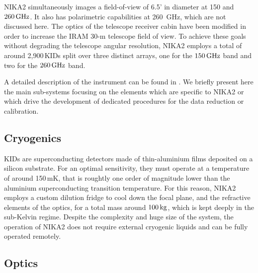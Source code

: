 
NIKA2 simultaneously images a field-of-view of
6.5' in diameter at 150 and $260\,\rm{GHz}$. It also has polarimetric
capabilities at 260~GHz, which are not discussed here. The optics of
the telescope receiver cabin have been modified in order
to increase the IRAM 30-m telescope field of view. To achieve these
goals without degrading the
telescope angular resolution, NIKA2 employs a total of around
2,900\,KIDs split over three distinct arrays, one for the $150\,\rm{GHz}$
band and two for the $260\,\rm{GHz}$ band.

A detailed description of the instrument can be found in
\citet{Adam2018}. We briefly present here the main sub-systems
focusing on the elements which are specific to NIKA2
or which drive the development of dedicated procedures for the data
reduction or calibration.


\subsection{Cryogenics}

{\lp KIDs are superconducting detectors made of thin-aluminium films deposited
on a silicon substrate.
For an optimal sensitivity, they must operate at a temperature of
around 150\,mK, that is roughtly one order of magnitude lower than the
aluminium superconducting transition temperature.}  
For this reason,
NIKA2 employs a custom dilution fridge to cool down the focal plane, and the
refractive elements of the optics, for a total mass around $100\, \rm{kg}$,
which is kept deeply in the sub-Kelvin regime. Despite the complexity
and huge size of the system, the operation of NIKA2 does not require
external cryogenic liquids and can be fully operated remotely.


\subsection{Optics}

